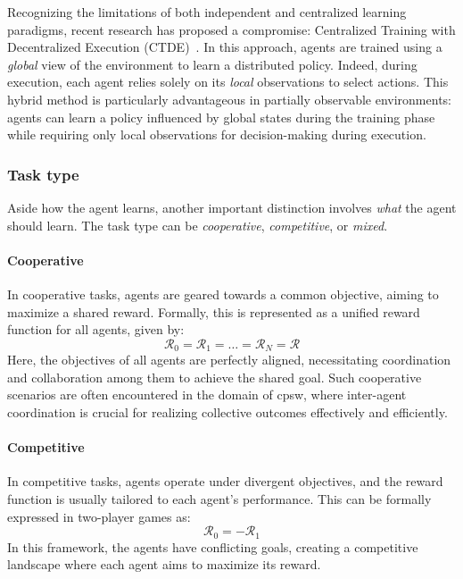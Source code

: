Recognizing the limitations of both independent and centralized learning paradigms, 
 recent research has proposed a compromise: 
 Centralized Training with Decentralized Execution (CTDE)~\cite{DBLP:conf/nips/LoweWTHAM17}. 
 In this approach, agents are trained using a \emph{global} view of the environment to learn a distributed policy. 
 Indeed, during execution, each agent relies solely on its \emph{local} observations to select actions. 
 This hybrid method is particularly advantageous in partially observable environments: 
 agents can learn a policy influenced by global states during the training phase while requiring only local observations for decision-making during execution.

\subsubsection{Task type}
Aside how the agent learns, 
 another important distinction involves \emph{what} the agent should learn.
%
The task type can be \emph{cooperative}, \emph{competitive}, or \emph{mixed}.
\paragraph*{Cooperative}
In cooperative tasks, 
 agents are geared towards a common objective, 
 aiming to maximize a shared reward. 
 Formally, this is represented as a unified reward function for all agents, given by:
\begin{equation}
\mathcal{R}_0 = \mathcal{R}_1 = \ldots = \mathcal{R}_N = \mathcal{R}
\end{equation}
Here, the objectives of all agents are perfectly aligned, 
 necessitating coordination and collaboration among them to achieve the shared goal. 
 Such cooperative scenarios are often encountered in the domain of \ac{cpsw}, 
 where inter-agent coordination is crucial for realizing collective outcomes effectively and efficiently.
\paragraph*{Competitive}
In competitive tasks, agents operate under divergent objectives, 
 and the reward function is usually tailored to each agent's performance. 
This can be formally expressed in two-player games as:
\begin{equation}
\mathcal{R}_0 = -\mathcal{R}_1
\end{equation}
In this framework, the agents have conflicting goals, 
 creating a competitive landscape where each agent aims to maximize its reward. 
